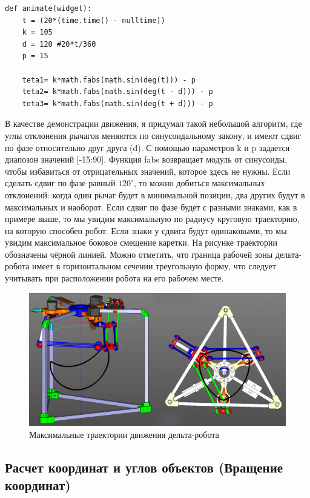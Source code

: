 \begin{lstlisting}[style=python,caption=Рисование максимальных траекторий дельта-робота]
def animate(widget):
    t = (20*(time.time() - nulltime))
    k = 105
    d = 120 #20*t/360
    p = 15

    teta1= k*math.fabs(math.sin(deg(t))) - p
    teta2= k*math.fabs(math.sin(deg(t - d))) - p
    teta3= k*math.fabs(math.sin(deg(t + d))) - p

\end{lstlisting}

В качестве демонстрации движения, я придумал такой небольшой алгоритм, где углы отклонения рычагов меняются по синусоидальному закону, и имеют сдвиг по фазе относительно друг друга (d).
С помощью параметров k и p задается диапозон значений [-15:90].
Функция fabs возвращает модуль от синусоиды, чтобы избавиться от отрицательных значений, которое здесь не нужны.  
Если сделать сдвиг по фазе равный $120^{\circ}$, то можно добиться максимальных отклонений: когда один рычаг будет в минимальной позиции, два других будут в максимальных и наоборот.
Если сдвиг по фазе будет с разными знаками, как в примере выше, то мы увидим максимальную по радиусу круговую траекторию, на которую способен робот.
Если знаки у сдвига будут одинаковыми, то мы увидим максимальное боковое смещение каретки.
На рисунке траектории обозначены чёрной линией.
Можно отметить, что граница рабочей зоны дельта-робота имеет в горизонтальном сечении треугольную форму, что следует учитывать при расположении робота на его рабочем месте.  

\begin{figure}[h]
\centering
\includegraphics[width=0.8\linewidth]{./image/traek}
\caption{Максимальные траектории движения дельта-робота }
\end{figure}


\subsection{Расчет координат и углов объектов (Вращение координат)}

